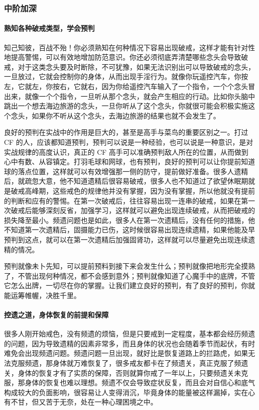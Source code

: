 \subsubsection{中阶加深}

\paragraph{熟知各种破戒类型，学会预判}

知己知彼，百战不殆！你必须熟知在何种情况下容易出现破戒，这样才能有针对性地提高警惕，可以有效地增加防范意识。你还必须彻底弄清楚哪些念头会导致破戒，对于这类念头要及时断除，不可犹豫，如果无法识别出可以导致破戒的念头，一旦放过，它就会控制你的身体，从而出现手淫行为。就像你玩遥控汽车，你按左，它就左，你按右，它就右，因为你给遥控汽车输入了一个指令，一个个念头冒出来，就像一个个指令，一旦听从那个念头，就会产生相应的行动。比如你头脑中跳出一个想去海边旅游的念头，一旦你听从了这个念头，你就很可能会积极实施这个念头，如果你不听从这个念头，去海边旅游的结果也就不会发生了。

良好的预判在实战中的作用是巨大的，甚至是高手与菜鸟的重要区别之一。打过 CF 的人，应该都知道预判，预判可以说是一种经验，也可以说是一种意识，是对实战规律的高度认识，真正的 CF 高手可以准确预判敌人所在的位置，从而做到心中有数、从容镇定。打羽毛球和网球，也有预判，良好的预判可以让你提前知道球的落点位置，这样就可以有效增强那一侧的防守，提前做好准备。很多人遗精后，就疏忽大意，他不知道遗精后很容易破戒，很多人也不知道过了欲望休眠期就是破戒高峰期，这些戒色的规律他并没有掌握，因为没有掌握，所以他就没有提前的判断和应有的警惕。在第一次破戒后，往往容易出现一连串的破戒，如果在第一次破戒后能够深刻反省，加强学习，这样就可以避免出现连续破戒，从而把破戒的损失降至最小。频遗问题也是如此，很多人在第一次遗精后，没有任何的措施，他不知道第一次遗精后，固摄能力已伤，这时候很容易出现连续遗精，如果他能及早预判到这点，就可以在第一次遗精后加强固肾功，这样就可以尽量避免出现连续遗精的情况。

预判就像未卜先知，可以提前预料到接下来会发生什么；预判就像把地形完全摸熟了，不管出现何种情况，都不会感到意外；预判就像知道了心魔手中的底牌，不管它怎么出牌，一切尽在你的掌握。让我们建立良好的预判，有了良好的预判，你就能运筹帷幄，决胜千里。

\paragraph{控遗之道，身体恢复的前提和保障}

很多人刚开始戒色，没有频遗的烦恼，但是只要戒到一定程度，基本都会经历频遗的问题，因为导致遗精的因素非常多，而且身体的状况也会随着季节而起伏，有时难免会出现频遗问题。频遗问题一旦出现，就好比是恢复道路上的拦路虎，如果无法克服频遗，那身体就万难恢复了，很多戒友都卡在了频遗关，真正克服了频遗关，身体的恢复才有了实质的保障，否则就算你戒了一年以上，只要频遗关未克服，那身体的恢复也难以理想。频遗不仅会导致症状反复，而且会对自信心和底气构成较大的负面影响，很容易让人变得消沉，毕竟身体的能量被这样漏掉，实在心有不甘，但又苦于无奈，处在一种心理困境之中。

